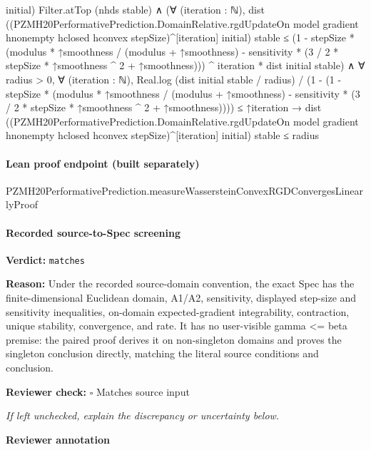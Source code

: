 \documentclass[10pt]{article}
\newcommand{\reviewerbox}{%
  \par\noindent\fbox{\parbox{0.96\linewidth}{\rule{0pt}{0.38in}}}\par
}
\newcommand{\reviewmatch}[1]{%
  \par\noindent\textbf{Reviewer check:} $\square$\; #1\par
  \noindent\emph{If left unchecked, explain the discrepancy or uncertainty below.}\par
}
\begin{document}
\begin{ReviewVerbatim}
                initial)
            Filter.atTop (nhds stable) ∧
          (∀ (iteration : ℕ),
              dist
                  ((PZMH20PerformativePrediction.DomainRelative.rgdUpdateOn model gradient hnonempty hclosed hconvex
                        stepSize)^[iteration]
                    initial)
                  stable ≤
                (1 -
                      stepSize *
                        (modulus * ↑smoothness / (modulus + ↑smoothness) -
                          sensitivity * (3 / 2 * stepSize * ↑smoothness ^ 2 + ↑smoothness))) ^
                    iteration *
                  dist initial stable) ∧
            ∀ radius > 0,
              ∀ (iteration : ℕ),
                Real.log (dist initial stable / radius) /
                      (1 -
                        (1 -
                          stepSize *
                            (modulus * ↑smoothness / (modulus + ↑smoothness) -
                              sensitivity * (3 / 2 * stepSize * ↑smoothness ^ 2 + ↑smoothness)))) ≤
                    ↑iteration →
                  dist
                      ((PZMH20PerformativePrediction.DomainRelative.rgdUpdateOn model gradient hnonempty hclosed hconvex
                            stepSize)^[iteration]
                        initial)
                      stable ≤
                    radius
\end{ReviewVerbatim}

\paragraph{Lean proof endpoint (built separately)}\begin{ReviewVerbatim}
PZMH20PerformativePrediction.measureWassersteinConvexRGDConvergesLinearlyProof
\end{ReviewVerbatim}

\paragraph{Recorded source-to-Spec screening}
\textbf{Verdict:} \texttt{matches}
\\
{\raggedright
\textbf{Reason:} Under the recorded source-\allowbreak{}domain convention, the exact Spec has the finite-\allowbreak{}dimensional Euclidean domain, A1/\allowbreak{}A2, sensitivity, displayed step-\allowbreak{}size and sensitivity inequalities, on-\allowbreak{}domain expected-\allowbreak{}gradient integrability, contraction, unique stability, convergence, and rate.\allowbreak{} It has no user-\allowbreak{}visible gamma <= beta premise:\allowbreak{} the paired proof derives it on non-\allowbreak{}singleton domains and proves the singleton conclusion directly, matching the literal source conditions and conclusion.\allowbreak{}
\par}
\reviewmatch{Matches source input}
\noindent\textbf{Reviewer annotation}\par
\reviewerbox
\clearpage
\hypertarget{source-claim-bb0077763720ebbf}{}
\end{document}
